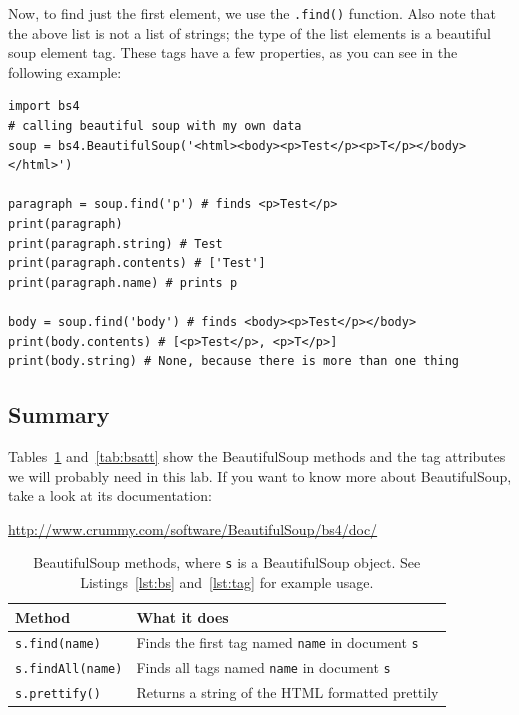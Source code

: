 \documentclass[11pt]{cselabheader}
\begin{document}
Now, to find just the first element, we use the \lstinline!.find()! function.
Also note that the above list is not a list of strings; the type of the list
elements is a beautiful soup element tag. These tags have a few properties, as
you can see in the following example:

\begin{lstlisting}[caption={BeautifulSoup tag usage},label={lst:tag}]
import bs4
# calling beautiful soup with my own data
soup = bs4.BeautifulSoup('<html><body><p>Test</p><p>T</p></body></html>')

paragraph = soup.find('p') # finds <p>Test</p>
print(paragraph)
print(paragraph.string) # Test
print(paragraph.contents) # ['Test']
print(paragraph.name) # prints p

body = soup.find('body') # finds <body><p>Test</p></body>
print(body.contents) # [<p>Test</p>, <p>T</p>]
print(body.string) # None, because there is more than one thing
\end{lstlisting}

\subsection{Summary}

Tables~\ref{tab:bsmeth} and~\ref{tab:bsatt} show the BeautifulSoup methods and
the tag attributes we will probably need in this lab. If you want to know more
about BeautifulSoup, take a look at its documentation:
\begin{center}
  \url{http://www.crummy.com/software/BeautifulSoup/bs4/doc/}
\end{center}

\begin{table}[!ht]
  \centering
  \begin{tabular}{p{3cm} p{11cm}}
    \toprule
    \bfseries Method & \bfseries What it does \\
    \midrule
    \lstinline!s.find(name)! & Finds the first tag named \lstinline!name! in
    document \lstinline!s! \\
    \lstinline!s.findAll(name)! & Finds all tags named \lstinline!name! in
    document \lstinline!s! \\
    \lstinline!s.prettify()! & Returns a string of the HTML formatted prettily
    \\
    \bottomrule
  \end{tabular}
  \caption{BeautifulSoup methods, where \lstinline!s! is a BeautifulSoup object.
    See Listings~\ref{lst:bs} and~\ref{lst:tag} for example usage.}
  \label{tab:bsmeth}
\end{table}
\end{document}
